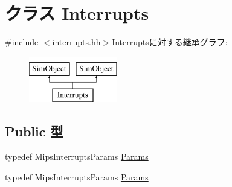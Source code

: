 \hypertarget{classMipsISA_1_1Interrupts}{
\section{クラス Interrupts}
\label{classMipsISA_1_1Interrupts}
}


{\ttfamily \#include $<$interrupts.hh$>$}Interruptsに対する継承グラフ:\begin{figure}[H]
\begin{center}
\leavevmode
\includegraphics[height=2cm]{classMipsISA_1_1Interrupts}
\end{center}
\end{figure}
\subsection*{Public 型}
\begin{DoxyCompactItemize}
\item 
typedef MipsInterruptsParams \hyperlink{classMipsISA_1_1Interrupts_a2d2df962f437c169ec932010a88ab884}{Params}
\item 
typedef MipsInterruptsParams \hyperlink{classMipsISA_1_1Interrupts_a2d2df962f437c169ec932010a88ab884}{Params}
\end{DoxyCompactItemize}
